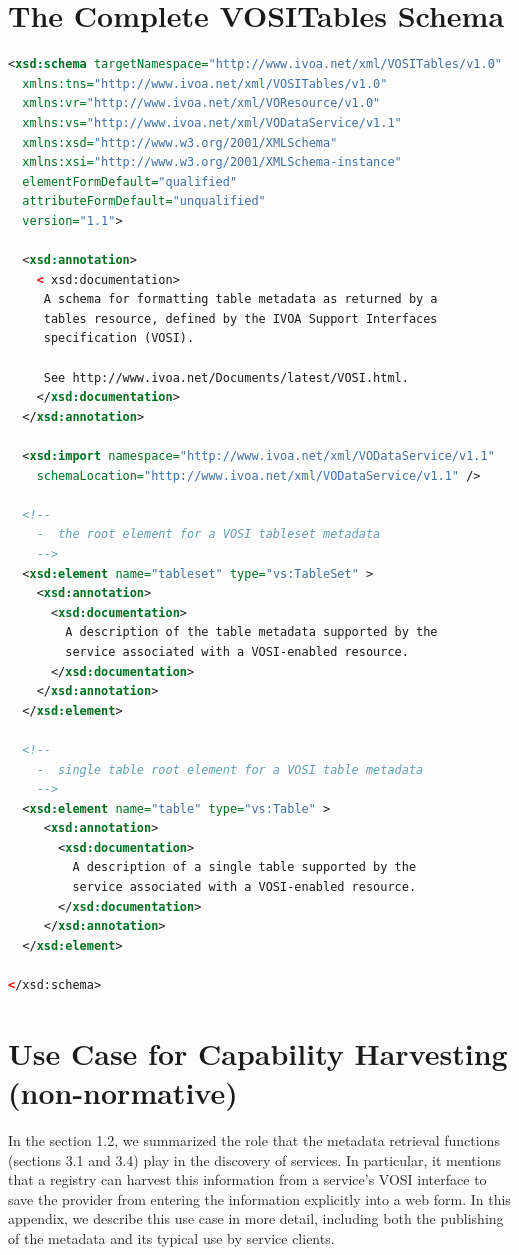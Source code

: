 \documentclass[11pt,letter]{ivoa}
\begin{document}
\section{The Complete VOSITables Schema}
\begin{lstlisting}[language=XML]
<xsd:schema targetNamespace="http://www.ivoa.net/xml/VOSITables/v1.0"
  xmlns:tns="http://www.ivoa.net/xml/VOSITables/v1.0"
  xmlns:vr="http://www.ivoa.net/xml/VOResource/v1.0"
  xmlns:vs="http://www.ivoa.net/xml/VODataService/v1.1"
  xmlns:xsd="http://www.w3.org/2001/XMLSchema"
  xmlns:xsi="http://www.w3.org/2001/XMLSchema-instance"
  elementFormDefault="qualified"
  attributeFormDefault="unqualified"
  version="1.1">

  <xsd:annotation>
    < xsd:documentation>
     A schema for formatting table metadata as returned by a 
     tables resource, defined by the IVOA Support Interfaces 
     specification (VOSI). 

     See http://www.ivoa.net/Documents/latest/VOSI.html.  
    </xsd:documentation>
  </xsd:annotation>

  <xsd:import namespace="http://www.ivoa.net/xml/VODataService/v1.1"
    schemaLocation="http://www.ivoa.net/xml/VODataService/v1.1" />

  <!--
    -  the root element for a VOSI tableset metadata
    -->
  <xsd:element name="tableset" type="vs:TableSet" >
    <xsd:annotation>
      <xsd:documentation>
        A description of the table metadata supported by the 
        service associated with a VOSI-enabled resource.
      </xsd:documentation>
    </xsd:annotation>
  </xsd:element>
  
  <!--
    -  single table root element for a VOSI table metadata
    -->
  <xsd:element name="table" type="vs:Table" >
     <xsd:annotation>
       <xsd:documentation>
         A description of a single table supported by the
         service associated with a VOSI-enabled resource.
       </xsd:documentation>
     </xsd:annotation>
  </xsd:element>

</xsd:schema>
\end{lstlisting}

\section{Use Case for Capability Harvesting (non-normative)}

 In the section 1.2, we summarized the role that the metadata retrieval functions (sections 3.1 and 3.4) play in the discovery of services. In particular, it mentions that a registry can harvest this information from a service's VOSI interface to save the provider from entering the information explicitly into a web form. In this appendix, we describe this use case in more detail, including both the publishing of the metadata and its typical use by service clients.
\end{document}

